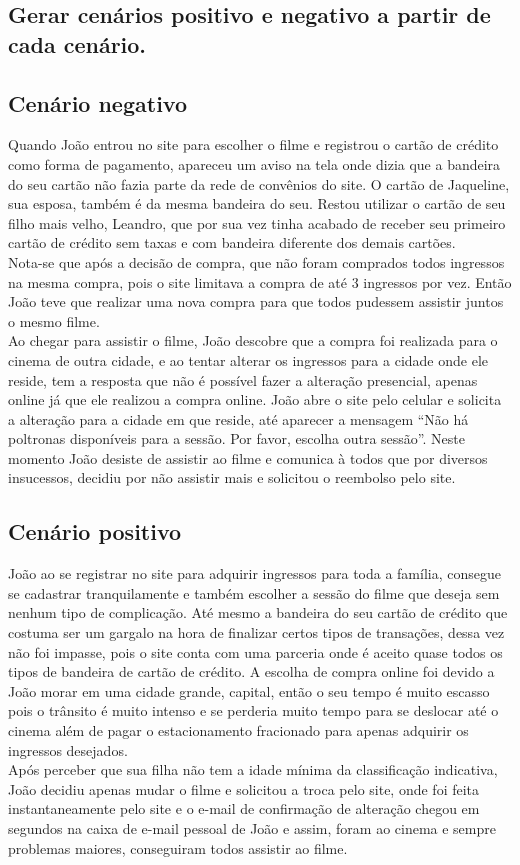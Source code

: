 \documentclass[12pt]{article}
\begin{document}
        \subsection{Gerar cenários positivo e negativo a partir de cada cenário.}
            \subsection{Cenário negativo}
            Quando João entrou no site para escolher o filme e registrou o cartão de crédito como forma de pagamento, apareceu um aviso na tela onde dizia que a bandeira do seu cartão não fazia parte da rede de convênios do site. O cartão de Jaqueline, sua esposa, também é da mesma bandeira do seu. Restou utilizar o cartão de seu filho mais velho, Leandro, que por sua vez tinha acabado de receber seu primeiro cartão de crédito sem taxas e com bandeira diferente dos demais cartões.\\
            Nota-se que após a decisão de compra, que não foram comprados todos ingressos na mesma compra, pois o site limitava a compra de até 3 ingressos por vez. Então João teve que realizar uma nova compra para que todos pudessem assistir juntos o mesmo filme. \\
            Ao chegar para assistir o filme, João descobre que a compra foi realizada para o cinema de outra cidade, e ao tentar alterar os ingressos para a cidade onde ele reside, tem a resposta que não é possível fazer a alteração presencial, apenas online já que ele realizou a compra online. João abre o site pelo celular e solicita a alteração para a cidade em que reside, até aparecer a mensagem “Não há poltronas disponíveis para a sessão. Por favor, escolha outra sessão”. Neste momento João desiste de assistir ao filme e comunica à todos que por diversos insucessos, decidiu por não assistir mais e solicitou o reembolso pelo site.
            \subsection{Cenário positivo}
            João ao se registrar no site para adquirir ingressos para toda a família, consegue se cadastrar tranquilamente e também escolher a sessão do filme que deseja sem nenhum tipo de complicação. Até mesmo a bandeira do seu cartão de crédito que costuma ser um gargalo na hora de finalizar certos tipos de transações, dessa vez não foi impasse, pois o site conta com uma parceria onde é aceito quase todos os tipos de bandeira de cartão de crédito. A escolha de compra online foi devido a João morar em uma cidade grande, capital, então o seu tempo é muito escasso pois o trânsito é muito intenso e se perderia muito tempo para se deslocar até o cinema além de pagar o estacionamento fracionado para apenas adquirir os ingressos desejados.\\
            Após perceber que sua filha não tem a idade mínima da classificação indicativa, João decidiu apenas mudar o filme e solicitou a troca pelo site, onde foi feita instantaneamente pelo site e o e-mail de confirmação de alteração chegou em segundos na caixa de e-mail pessoal de João e assim, foram ao cinema e sempre problemas maiores, conseguiram todos assistir ao filme.
     
\end{document}
